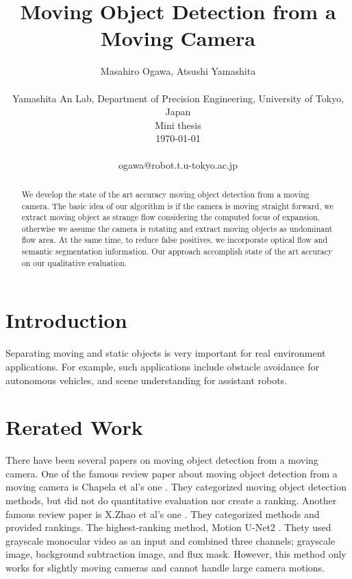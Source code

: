\documentclass[10pt, twocolumn]{article}
\begin{document}
\title{Moving Object Detection from a Moving Camera}

\author{Masahiro Ogawa, Atsushi Yamashita \\
  \\
  Yamashita An Lab,
  Department of Precision Engineering,
  University of Tokyo, Japan\\
  Mini thesis\\
  \today
  \\
  \\
  ogawa@robot.t.u-tokyo.ac.jp}

\maketitle
\thispagestyle{empty}

\begin{abstract}
 We develop the state of the art accuracy moving object detection from a moving camera.
 The basic idea of our algorithm is if the camera is moving straight forward, we extract moving object as strange flow considering the computed focus of expansion, otherwise we assume the camera is rotating and extract moving objects as undominant flow area. At the same time, to reduce false positives, we incorporate optical flow and semantic segmentation information.
 Our approach accomplish state of the art accuracy on our qualitative evaluation.
\end{abstract}


\section{Introduction}
Separating moving and static objects is very important for real environment applications.
For example, such applications include obstacle avoidance for autonomous vehicles, and scene understanding for assistant robots.


\section{Rerated Work}
There have been several papers on moving object detection from a moving camera.
One of the famous review paper about moving object detection from a moving camera is Chapela et al's one \cite{chapel2020moving}.
They categorized moving object detection methods, but did not do quantitative evaluation nor create a ranking.
Another famous review paper is X.Zhao et al's one \cite{ZHAO202228}.
They categorized methods and provided rankings.
The highest-ranking method, Motion U-Net2 \cite{DBLP:conf/icpr/RahmonBSP20}.
Thety used grayscale monocular video as an input and combined three channels; grayscale image, background subtraction image, and flux mask.
However, this method only works for slightly moving cameras and cannot handle large camera motions.
\end{document}
